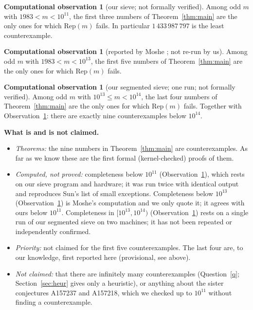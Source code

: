 \documentclass[11pt,a4paper]{article}
\theoremstyle{definition}\newtheorem{definition}[theorem]{Definition}
\newtheorem{observation}[theorem]{Computational observation}\newtheorem{question}[theorem]{Open question}
\theoremstyle{remark}\newtheorem{remark}[theorem]{Remark}
\newcommand{\Rep}{\mathrm{Rep}}
\begin{document}
\begin{observation}[our sieve; not formally verified]\label{obs}
Among odd $m$ with $1983<m<10^{11}$, the first three numbers of Theorem~\ref{thm:main} are the only ones for which
$\Rep(m)$ fails. In particular $1\,433\,987\,797$ is the least counterexample.
\end{observation}
\begin{observation}[reported by Moshe \cite{moshe}; not re-run by us]\label{obs13}
Among odd $m$ with $1983<m<10^{13}$, the first five numbers of Theorem~\ref{thm:main} are the only ones for which
$\Rep(m)$ fails.
\end{observation}
\begin{observation}[our segmented sieve; one run; not formally verified]\label{obs14}
Among odd $m$ with $10^{13}\le m<10^{14}$, the last four numbers of Theorem~\ref{thm:main} are the only ones for
which $\Rep(m)$ fails. Together with Observation~\ref{obs13}: there are exactly nine counterexamples below $10^{14}$.
\end{observation}

\noindent\textbf{What is and is not claimed.}
\begin{itemize}[leftmargin=1.4em,itemsep=1pt]
\item \emph{Theorems:} the nine numbers in Theorem~\ref{thm:main} are counterexamples. As far as we know these
are the first formal (kernel-checked) proofs of them.
\item \emph{Computed, not proved:} completeness below $10^{11}$ (Observation~\ref{obs}), which rests on our sieve
program and hardware; it was run twice with identical output and reproduces Sun's list of small exceptions.
Completeness below $10^{13}$ (Observation~\ref{obs13}) is Moshe's computation and we only quote it; it agrees
with ours below $10^{11}$. Completeness in $[10^{13},10^{14})$ (Observation~\ref{obs14}) rests on a single run of
our segmented sieve on two machines; it has not been repeated or independently confirmed.
\item \emph{Priority:} not claimed for the first five counterexamples. The last four are, to our knowledge, first reported here (provisional, see above).
\item \emph{Not claimed:} that there are infinitely many counterexamples (Question~\ref{q}; Section~\ref{sec:heur} gives only a heuristic), or anything about the
sister conjectures A157237 and A157218, which we checked up to $10^{11}$ without finding a counterexample.
\end{itemize}
\end{document}
